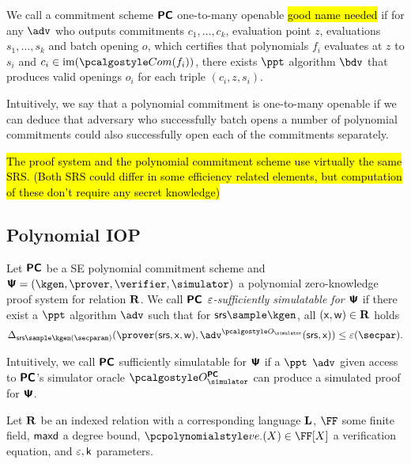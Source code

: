 \documentclass[runningheads,11pt]{llncs}
\begin{document}
 \begin{definition}
   We call a commitment scheme $\bm{\mathsf{PC}}$ one-to-many openable \hl{good name
     needed} if for any $\adv$ who outputs commitments $c_1, \ldots, c_k$,
   evaluation point $z$, evaluations $s_1, \ldots, s_k$ and batch opening $o$,
   which certifies that polynomials $f_i$ evaluates at $z$ to $s_i$ and
   $c_i \in \image(\com(f_i))$, there exists $\ppt$ algorithm $\bdv$ that
   produces valid openings $o_i$ for each triple $(c_i, z, s_i)$.
 \end{definition}
 Intuitively, we say that a polynomial commitment is one-to-many openable if we
 can deduce that adversary who successfully batch opens a number of polynomial
 commitments could also successfully open each of the commitments separately.


 \begin{definition}
\hl{The proof system and the polynomial commitment scheme use virtually the same
SRS. (Both SRS could differ in some efficiency related elements, but computation
of these don't require any secret knowledge)}
   \end{definition}

\subsection{Polynomial IOP}
 \begin{definition}
   Let $\bm{\mathsf{PC}}$ be a SE polynomial commitment scheme and
   $\PS = (\kgen, \prover, \verifier, \simulator)$ a polynomial zero-knowledge proof system
   for relation $\mathbf{R}$. We call $\bm{\mathsf{PC}}$ \emph{$\varepsilon$-sufficiently simulatable for
     $\bm{\mathsf{\Psi}}$} if there exist a $\ppt$ algorithm $\adv$ such that for
   $\srs \sample \kgen$, all $(\mathsf{x}, \mathsf{w}) \in \mathbf{R}$ holds
   \[
     \SD_{\srs \sample \kgen(\secparam)}(\prover(\srs, \inp, \wit),
     \adv^{\oracles}(\srs, \inp)) \leq \eps(\secpar).
   \]
 \end{definition}
 Intuitively, we call $\bm{\mathsf{PC}}$ sufficiently simulatable for $\bm{\mathsf{\Psi}}$ if a $\ppt$
 $\adv$ given access to $\bm{\mathsf{PC}}$'s simulator oracle $\oraclespcom$ can produce a
 simulated proof for $\bm{\mathsf{\Psi}}$.

 \begin{definition}
  \label{def:php}
  Let $\mathbf{R}$ be an indexed relation with a corresponding language $\mathbf{L}$, $\FF$
  some finite field, $\mathsf{maxd}$ a degree bound, $\vereq_{\cdot}(X) \in \FF[X]$ a
  verification equation, and $\varepsilon, \mathsf{k}$ parameters.
\end{definition}
\end{document}
